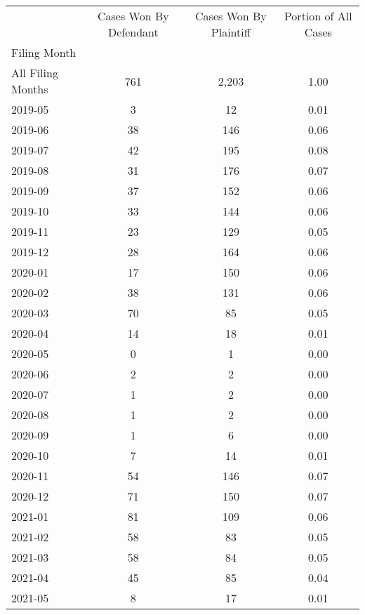 \begin{tabular}{lccc}
\toprule
 & Cases Won By Defendant & Cases Won By Plaintiff & Portion of All Cases \\
Filing Month &  &  &  \\
\midrule
All Filing Months & 761 & 2,203 & 1.00 \\
2019-05 & 3 & 12 & 0.01 \\
2019-06 & 38 & 146 & 0.06 \\
2019-07 & 42 & 195 & 0.08 \\
2019-08 & 31 & 176 & 0.07 \\
2019-09 & 37 & 152 & 0.06 \\
2019-10 & 33 & 144 & 0.06 \\
2019-11 & 23 & 129 & 0.05 \\
2019-12 & 28 & 164 & 0.06 \\
2020-01 & 17 & 150 & 0.06 \\
2020-02 & 38 & 131 & 0.06 \\
2020-03 & 70 & 85 & 0.05 \\
2020-04 & 14 & 18 & 0.01 \\
2020-05 & 0 & 1 & 0.00 \\
2020-06 & 2 & 2 & 0.00 \\
2020-07 & 1 & 2 & 0.00 \\
2020-08 & 1 & 2 & 0.00 \\
2020-09 & 1 & 6 & 0.00 \\
2020-10 & 7 & 14 & 0.01 \\
2020-11 & 54 & 146 & 0.07 \\
2020-12 & 71 & 150 & 0.07 \\
2021-01 & 81 & 109 & 0.06 \\
2021-02 & 58 & 83 & 0.05 \\
2021-03 & 58 & 84 & 0.05 \\
2021-04 & 45 & 85 & 0.04 \\
2021-05 & 8 & 17 & 0.01 \\
\bottomrule
\end{tabular}
